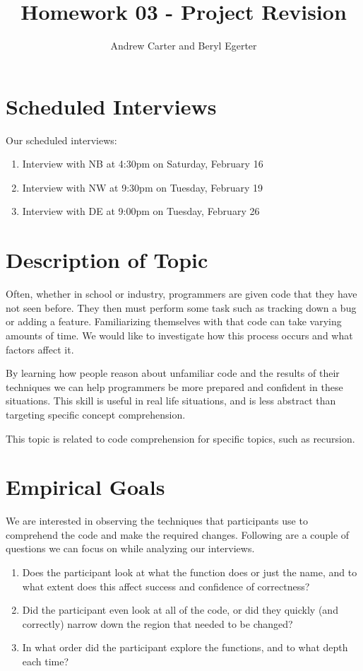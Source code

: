 \documentclass{article}
\title{Homework 03 - Project Revision}
\author{Andrew Carter and Beryl Egerter}
\begin{document}
\maketitle
\section{Scheduled Interviews}
Our scheduled interviews:
\begin{enumerate}
  \item Interview with NB at 4:30pm on Saturday, February 16
  \item Interview with NW at 9:30pm on Tuesday, February 19
  \item Interview with DE at 9:00pm on Tuesday, February 26
\end{enumerate}
\section{Description of Topic}

Often, whether in school or industry, programmers are given code that they have not seen before.
They then must perform some task such as tracking down a bug or adding a feature.
Familiarizing themselves with that code can take varying amounts of time.
We would like to investigate how this process occurs and what factors affect it.

By learning how people reason about unfamiliar code and the results of their techniques we can help programmers be more prepared and confident in these situations.
This skill is useful in real life situations, and is less abstract than targeting specific concept comprehension.

This topic is related to code comprehension for specific topics, such as recursion.
\section{Empirical Goals}

We are interested in observing the techniques that participants use to comprehend the code and make the required changes. Following are a couple of questions we can focus on while analyzing our interviews.
\begin{enumerate}
	\item Does the participant look at what the function does or just the name, and to what extent does this affect success and confidence of correctness?
	\item Did the participant even look at all of the code, or did they quickly (and correctly) narrow down the region that needed to be changed?
	\item In what order did the participant explore the functions, and to what depth each time?
\end{enumerate}
\end{document}
